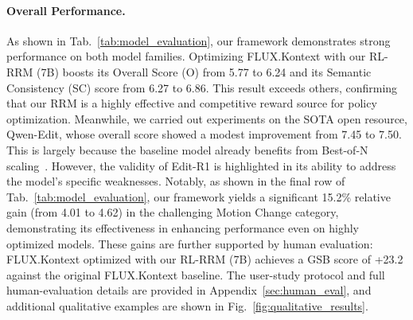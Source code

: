 \paragraph{Overall Performance.}
As shown in Tab.~\ref{tab:model_evaluation}, our framework demonstrates strong performance on both model families. Optimizing FLUX.Kontext with our RL-RRM (7B) boosts its Overall Score (O) from 5.77 to 6.24 and its Semantic Consistency (SC) score from 6.27 to 6.86. This result exceeds others, confirming that our RRM is a highly effective and competitive reward source for policy optimization.
Meanwhile, we carried out experiments on the SOTA open resource, Qwen-Edit, whose overall score showed a modest improvement from 7.45 to 7.50. This is largely because the baseline model already benefits from Best-of-N scaling~\cite{luo2025editscore}. However, the validity of Edit-R1 is highlighted in its ability to address the model's specific weaknesses.
Notably, as shown in the final row of Tab.~\ref{tab:model_evaluation}, our framework yields a significant 15.2\% relative gain (from 4.01 to 4.62) in the challenging Motion Change category, demonstrating its effectiveness in enhancing performance even on highly optimized models. These gains are further supported by human evaluation: FLUX.Kontext optimized with our RL-RRM (7B) achieves a GSB score of +23.2 against the original FLUX.Kontext baseline. The user-study protocol and full human-evaluation details are provided in Appendix~\ref{sec:human_eval}, and additional qualitative examples are shown in Fig.~\ref{fig:qualitative_results}.
